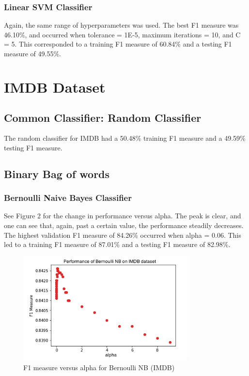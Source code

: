\documentclass[11pt]{article}
\begin{document}
\subsubsection{Linear SVM Classifier}
Again, the same range of hyperparameters was used. The best F1 measure was 46.10\%, and occurred when tolerance = 1E-5, maximum iterations = 10, and C = 5. This corresponded to a training F1 measure of 60.84\% and a testing F1 measure of 49.55\%.

\section{IMDB Dataset}
\subsection{Common Classifier: Random Classifier}
The random classifier for IMDB had a 50.48\% training F1 measure and a 49.59\% testing F1 measure.

\subsection{Binary Bag of words}

\subsubsection{Bernoulli Naive Bayes Classifier}
See Figure 2 for the change in performance versus alpha. The peak is clear, and one can see that, again, past a certain value, the performance steadily decreases. The highest validation F1 measure of 84.26\% occurred when alpha = 0.06. This led to a training F1 measure of 87.01\% and a testing F1 measure of 82.98\%.

\begin{figure}[h]
\centering
\includegraphics[width=0.8\textwidth]{IMDB_BernoulliNB}
\caption{F1 measure versus alpha for Bernoulli NB (IMDB)}
\end{figure}
\end{document}
